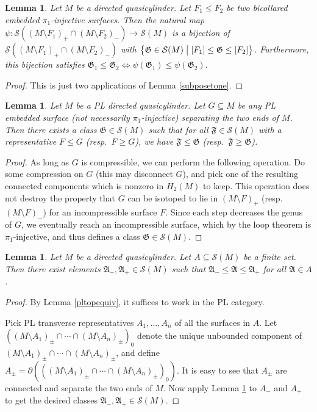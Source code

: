 \documentclass[12pt]{article}
\theoremstyle{plain}
\newtheorem{lemma}[theorem]{Lemma}
\theoremstyle{definition}
\theoremstyle{remark}
\numberwithin{equation}{section}
\begin{document}
\begin{lemma}\label{subposettwo}
Let $M$ be a directed quasicylinder.  Let $F_1\leq F_2$ be two bicollared embedded $\pi_1$-injective surfaces.  Then the natural map $\psi:\mathcal S((M\setminus F_1)_+\cap(M\setminus F_2)_-)\to\mathcal S(M)$ is a bijection of $\mathcal S((M\setminus F_1)_+\cap(M\setminus F_2)_-)$ with $\left\{\mathfrak G\in\mathcal S(M)\bigm|[F_1]\leq\mathfrak G\leq[F_2]\right\}$.  Furthermore, this bijection satisfies $\mathfrak G_1\leq\mathfrak G_2\iff\psi(\mathfrak G_1)\leq\psi(\mathfrak G_2)$.
\end{lemma}

\begin{proof}
This is just two applications of Lemma \ref{subposetone}.
\end{proof}

\begin{lemma}\label{maximalcompression}
Let $M$ be a PL directed quasicylinder.  Let $G\subseteq M$ be any PL embedded surface (not necessarily $\pi_1$-injective) separating the two ends of $M$.  Then there exists a class $\mathfrak G\in\mathcal S(M)$ such that for all $\mathfrak F\in\mathcal S(M)$ with a representative $F\leq G$ (resp.\ $F\geq G$), we have $\mathfrak F\leq\mathfrak G$ (resp.\ $\mathfrak F\geq\mathfrak G$).
\end{lemma}

\begin{proof}
As long as $G$ is compressible, we can perform the following operation.  Do some compression on $G$ (this may disconnect $G$), and pick one of the resulting connected components which is nonzero in $H_2(M)$ to keep.  This operation does not destroy the property that $G$ can be isotoped to lie in $(M\setminus F)_+$ (resp.\ $(M\setminus F)_-$) for an incompressible surface $F$.  Since each step decreases the genus of $G$, we eventually reach an incompressible surface, which by the loop theorem is $\pi_1$-injective, and thus defines a class $\mathfrak G\in\mathcal S(M)$.
\end{proof}

\begin{lemma}\label{existupperandlowerbounds}
Let $M$ be a directed quasicylinder.  Let $A\subseteq\mathcal S(M)$ be a finite set.  Then there exist elements $\mathfrak A_-,\mathfrak A_+\in\mathcal S(M)$ such that $\mathfrak A_-\leq\mathfrak A\leq\mathfrak A_+$ for all $\mathfrak A\in A$.
\end{lemma}

\begin{proof}
By Lemma \ref{pltopequiv}, it suffices to work in the PL category.

Pick PL transverse representatives $A_1,\ldots,A_n$ of all the surfaces in $A$.  Let $((M\setminus A_1)_\pm\cap\cdots\cap(M\setminus A_n)_\pm)_0$ denote the unique unbounded component of $(M\setminus A_1)_\pm\cap\cdots\cap(M\setminus A_n)_\pm$, and define $A_\pm=\partial(((M\setminus A_1)_\pm\cap\cdots\cap(M\setminus A_n)_\pm)_0)$.  It is easy to see that $A_\pm$ are connected and separate the two ends of $M$.  Now apply Lemma \ref{maximalcompression} to $A_-$ and $A_+$ to get the desired classes $\mathfrak A_-,\mathfrak A_+\in\mathcal S(M)$.
\end{proof}
\end{document}
